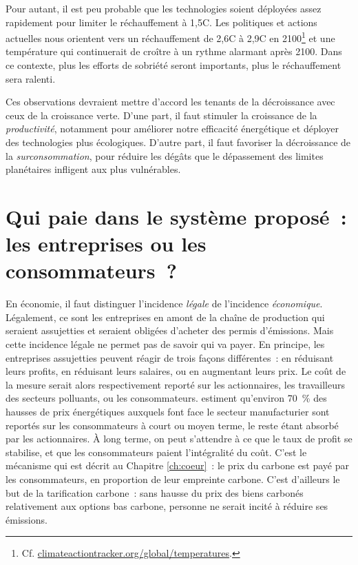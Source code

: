\documentclass[a5paper,french,openany]{memoir}
\begin{document}
Pour autant, il est peu probable que les technologies soient déployées assez rapidement pour limiter le réchauffement à 1,5\textdegree{}C. Les politiques et actions 
actuelles nous orientent vers un réchauffement de 2,6\textdegree{}C à 2,9\textdegree{}C en 2100\footnote{Cf. \href{https://climateactiontracker.org/global/temperatures/}{climateactiontracker.org/global/temperatures}.} et une température qui continuerait de croître à un rythme alarmant après 2100. Dans ce contexte, plus les efforts de sobriété seront importants, plus le réchauffement sera ralenti. 

Ces observations devraient mettre d'accord les tenants de la décroissance avec ceux de la croissance verte. D'une part, il faut stimuler la croissance de la \textit{productivité}, notamment pour améliorer notre efficacité énergétique et déployer des technologies plus écologiques. D'autre part, il faut favoriser la décroissance de la \textit{surconsommation}, pour réduire les dégâts que le dépassement des limites planétaires infligent aux plus vulnérables. 

\section*{\normalsize Qui paie dans le système proposé~: les entreprises ou les consommateurs~?}\label{q:incidence}

En économie, il faut distinguer l'incidence \textit{légale} de l'incidence \textit{économique}. Légalement, ce sont les entreprises en amont de la chaîne de production qui seraient assujetties et seraient obligées d'acheter des permis d'émissions. Mais cette incidence légale ne permet pas de savoir qui va payer. En principe, les entreprises assujetties peuvent réagir de trois façons différentes~: en réduisant leurs profits, en réduisant leurs salaires, ou en augmentant leurs prix. Le coût de la mesure serait alors respectivement reporté sur les actionnaires, les travailleurs des secteurs polluants, ou les consommateurs. \cite{ganapati_energy_2020} estiment qu'environ 70~\% des hausses de prix énergétiques auxquels font face le secteur manufacturier sont reportés sur les consommateurs à court ou moyen terme, le reste étant absorbé par les actionnaires. À long terme, on peut s'attendre à ce que le taux de profit se stabilise, et que les consommateurs paient l'intégralité du coût. C'est le mécanisme qui est décrit au Chapitre \ref{ch:coeur}~: le prix du carbone est payé par les consommateurs, en proportion de leur empreinte carbone. C'est d'ailleurs le but de la tarification carbone~: sans hausse du prix des biens carbonés relativement aux options bas carbone, personne ne serait incité à réduire ses émissions.
\end{document}
